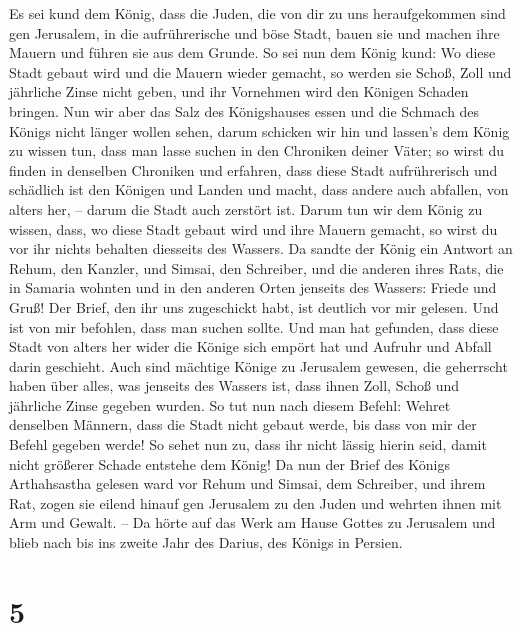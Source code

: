  Es sei kund dem König, dass die Juden, die von dir zu
uns heraufgekommen sind gen Jerusalem, in die aufrührerische und böse
Stadt, bauen sie und machen ihre Mauern und führen sie aus dem Grunde.
 So sei nun dem König kund: Wo diese Stadt gebaut wird
und die Mauern wieder gemacht, so werden sie Schoß, Zoll und jährliche
Zinse nicht geben, und ihr Vornehmen wird den Königen Schaden bringen.
 Nun wir aber das Salz des Königshauses essen und die
Schmach des Königs nicht länger wollen sehen, darum schicken wir hin und
lassen's dem König zu wissen tun,  dass man lasse suchen
in den Chroniken deiner Väter; so wirst du finden in denselben Chroniken
und erfahren, dass diese Stadt aufrührerisch und schädlich ist den
Königen und Landen und macht, dass andere auch abfallen, von alters her,
-- darum die Stadt auch zerstört ist.  Darum tun wir dem
König zu wissen, dass, wo diese Stadt gebaut wird und ihre Mauern
gemacht, so wirst du vor ihr nichts behalten diesseits des Wassers.
 Da sandte der König ein Antwort an Rehum, den Kanzler,
und Simsai, den Schreiber, und die anderen ihres Rats, die in Samaria
wohnten und in den anderen Orten jenseits des Wassers: Friede und Gruß!
 Der Brief, den ihr uns zugeschickt habt, ist deutlich
vor mir gelesen.  Und ist von mir befohlen, dass man
suchen sollte. Und man hat gefunden, dass diese Stadt von alters her
wider die Könige sich empört hat und Aufruhr und Abfall darin geschieht.
 Auch sind mächtige Könige zu Jerusalem gewesen, die
geherrscht haben über alles, was jenseits des Wassers ist, dass ihnen
Zoll, Schoß und jährliche Zinse gegeben wurden.  So tut
nun nach diesem Befehl: Wehret denselben Männern, dass die Stadt nicht
gebaut werde, bis dass von mir der Befehl gegeben werde! 
So sehet nun zu, dass ihr nicht lässig hierin seid, damit nicht größerer
Schade entstehe dem König!  Da nun der Brief des Königs
Arthahsastha gelesen ward vor Rehum und Simsai, dem Schreiber, und ihrem
Rat, zogen sie eilend hinauf gen Jerusalem zu den Juden und wehrten
ihnen mit Arm und Gewalt. --  Da hörte auf das Werk am
Hause Gottes zu Jerusalem und blieb nach bis ins zweite Jahr des Darius,
des Königs in Persien.

\hypertarget{section-4}{%
\section{5}\label{section-4}}

